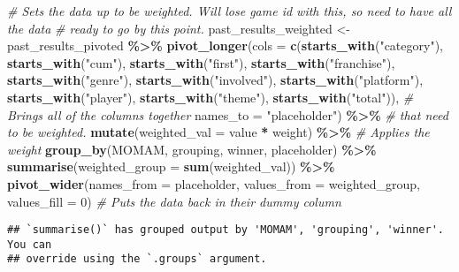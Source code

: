 \documentclass[
]{article}
\newenvironment{Shaded}{\begin{snugshade}}{\end{snugshade}}
\newcommand{\AttributeTok}[1]{\textcolor[rgb]{0.13,0.29,0.53}{#1}}
\newcommand{\CommentTok}[1]{\textcolor[rgb]{0.56,0.35,0.01}{\textit{#1}}}
\newcommand{\DecValTok}[1]{\textcolor[rgb]{0.00,0.00,0.81}{#1}}
\newcommand{\FunctionTok}[1]{\textcolor[rgb]{0.13,0.29,0.53}{\textbf{#1}}}
\newcommand{\NormalTok}[1]{#1}
\newcommand{\OtherTok}[1]{\textcolor[rgb]{0.56,0.35,0.01}{#1}}
\newcommand{\SpecialCharTok}[1]{\textcolor[rgb]{0.81,0.36,0.00}{\textbf{#1}}}
\newcommand{\StringTok}[1]{\textcolor[rgb]{0.31,0.60,0.02}{#1}}
\begin{document}
\begin{Shaded}
\begin{Highlighting}[]
\CommentTok{\# Sets the data up to be weighted. Will lose game id with this, so need to have all the data}
\CommentTok{\# ready to go by this point.}
\NormalTok{past\_results\_weighted }\OtherTok{\textless{}{-}}\NormalTok{ past\_results\_pivoted }\SpecialCharTok{\%\textgreater{}\%}
  \FunctionTok{pivot\_longer}\NormalTok{(}\AttributeTok{cols =} \FunctionTok{c}\NormalTok{(}\FunctionTok{starts\_with}\NormalTok{(}\StringTok{"category"}\NormalTok{), }\FunctionTok{starts\_with}\NormalTok{(}\StringTok{"cum"}\NormalTok{),}
                        \FunctionTok{starts\_with}\NormalTok{(}\StringTok{"first"}\NormalTok{), }\FunctionTok{starts\_with}\NormalTok{(}\StringTok{"franchise"}\NormalTok{),}
                        \FunctionTok{starts\_with}\NormalTok{(}\StringTok{"genre"}\NormalTok{), }\FunctionTok{starts\_with}\NormalTok{(}\StringTok{"involved"}\NormalTok{),}
                        \FunctionTok{starts\_with}\NormalTok{(}\StringTok{"platform"}\NormalTok{), }\FunctionTok{starts\_with}\NormalTok{(}\StringTok{"player"}\NormalTok{),}
                        \FunctionTok{starts\_with}\NormalTok{(}\StringTok{"theme"}\NormalTok{), }\FunctionTok{starts\_with}\NormalTok{(}\StringTok{"total"}\NormalTok{)), }\CommentTok{\# Brings all of the columns together}
               \AttributeTok{names\_to =} \StringTok{"placeholder"}\NormalTok{) }\SpecialCharTok{\%\textgreater{}\%}                        \CommentTok{\# that need to be weighted.}
  \FunctionTok{mutate}\NormalTok{(}\AttributeTok{weighted\_val =}\NormalTok{ value }\SpecialCharTok{*}\NormalTok{ weight) }\SpecialCharTok{\%\textgreater{}\%} \CommentTok{\# Applies the weight}
  \FunctionTok{group\_by}\NormalTok{(MOMAM, grouping, winner, placeholder) }\SpecialCharTok{\%\textgreater{}\%}
  \FunctionTok{summarise}\NormalTok{(}\AttributeTok{weighted\_group =} \FunctionTok{sum}\NormalTok{(weighted\_val)) }\SpecialCharTok{\%\textgreater{}\%}
  \FunctionTok{pivot\_wider}\NormalTok{(}\AttributeTok{names\_from =}\NormalTok{ placeholder, }\AttributeTok{values\_from =}\NormalTok{ weighted\_group, }\AttributeTok{values\_fill =} \DecValTok{0}\NormalTok{) }\CommentTok{\# Puts the data back in their dummy column}
\end{Highlighting}
\end{Shaded}

\begin{verbatim}
## `summarise()` has grouped output by 'MOMAM', 'grouping', 'winner'. You can
## override using the `.groups` argument.
\end{verbatim}
\end{document}
